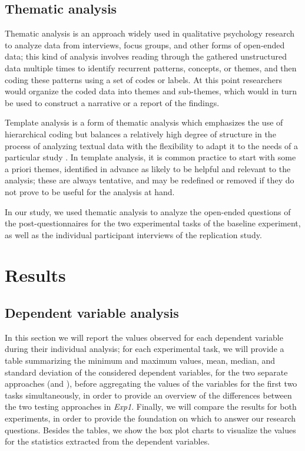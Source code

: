 \subsection{Thematic analysis}
Thematic analysis is an approach widely used in qualitative psychology research to analyze data from interviews, focus groups, and other forms of open-ended data; this kind of analysis involves reading through the gathered unstructured data multiple times to identify recurrent patterns, concepts, or themes, and then coding these patterns using a set of codes or labels. At this point researchers would organize the coded data into themes and sub-themes, which would in turn be used to construct a narrative or a report of the findings.

Template analysis is a form of thematic analysis which emphasizes the use of hierarchical coding but balances a relatively high degree of structure in the process of analyzing textual data with the flexibility to adapt it to the needs of a particular study \cite{ThematicAnalysis}. In template analysis, it is common practice to start with some a priori themes, identified in advance as likely to be helpful and relevant to the analysis; these are always tentative, and may be redefined or removed if they do not prove to be useful for the analysis at hand. 

In our study, we used thematic analysis to analyze the open-ended questions of the post-questionnaires for the two experimental tasks of the baseline experiment, as well as the individual participant interviews of the replication study.





\section{Results}
\subsection{Dependent variable analysis}
In this section we will report the values observed for each dependent variable during their individual analysis; for each experimental task, we will provide a table summarizing the minimum and maximum values, mean, median, and standard deviation of the considered dependent variables, for the two separate approaches (\ie \tdd and \notdd), before aggregating the values of the variables for the first two tasks simultaneously, in order to provide an overview of the differences between the two testing approaches in \textit{Exp1}.
Finally, we will compare the results for both experiments, in order to provide the foundation on which to answer our research questions.
Besides the tables, we show the box plot charts to visualize the values for the statistics extracted from the dependent variables.

